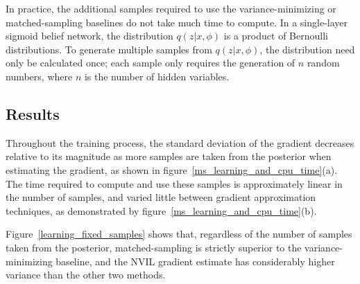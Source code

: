 \documentclass{article} %
\begin{document}
In practice, the additional samples required to use the variance-minimizing or matched-sampling baselines do not take much time to compute.  In a single-layer sigmoid belief network, the distribution $q(z|x, \phi)$ is a product of Bernoulli distributions.  To generate multiple samples from $q(z|x, \phi)$, the distribution need only be calculated once; each sample only requires the generation of $n$ random numbers, where $n$ is the number of hidden variables.  


\begin{comment}
(3) MSE for each baseline technique
  (a) Compute the gradient estimate $g_k^j$ using randomly select 10 inputs out of the 100 inputs $\{x_1, x_2, .., x_{10}\}$ and 10 samples from $q(z|x)$ for each $x_t$
  (b) Repeat (a) for 20 times with the fixed input set to get $\{g_k^1, .., g_k^{20}\}$
  (c) Repeat (a-b) for 20 times to get $\{ g_1^1, g_1^2, .., g_{20}^{20}\}$
  (d) Compute the squared error $\text{SE}_k^j = \| g_k^j - \hat{g} \|_2^2$ for all $k=1,..,20$ and $j=1,..,20$
  (e) The final MSE is $\text{MSE} = \frac{1}{20*20} \sum_{k,j=1}^{20} \text{SE}_k^j,$ and below I also report the standard deviation of the squared errors.
\end{comment}



\subsection{Results}

Throughout the training process, the standard deviation of the gradient decreases relative to its magnitude as more samples are taken from the posterior when estimating the gradient, as shown in figure~\ref{ms_learning_and_cpu_time}(a).  The time required to compute and use these samples is approximately linear in the number of samples, and varied little between gradient approximation techniques, as demonstrated by figure~\ref{ms_learning_and_cpu_time}(b).

Figure~\ref{learning_fixed_samples} shows that, regardless of the number of samples taken from the posterior, matched-sampling is strictly superior to the variance-minimizing baseline, and the NVIL gradient estimate has considerably higher variance than the other two methods.  
\end{document}
